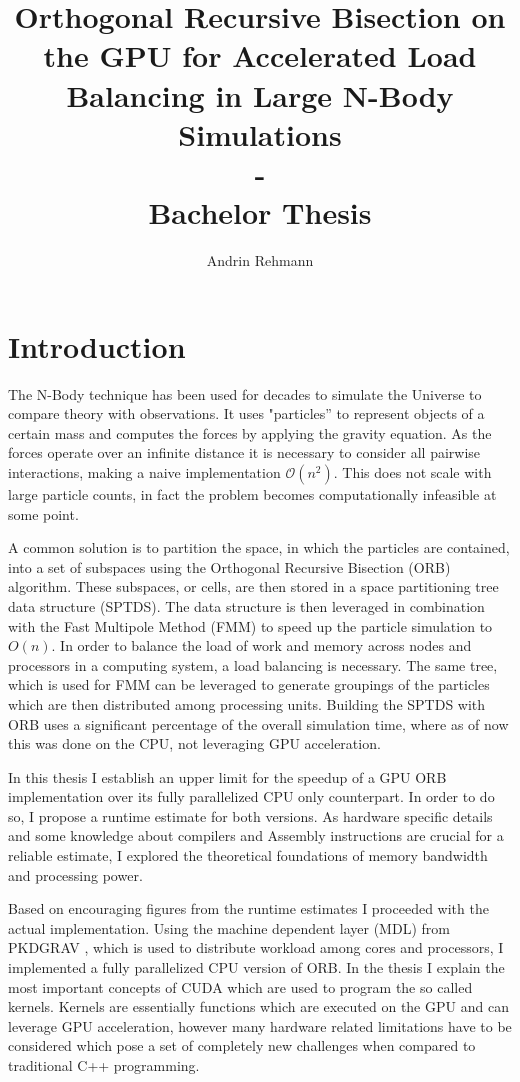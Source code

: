 \documentclass[]{article}
\title{Orthogonal Recursive Bisection on the GPU for Accelerated Load Balancing in Large N-Body Simulations \\ - \\ Bachelor Thesis}
\author{Andrin Rehmann}
\begin{document}
\maketitle

\newpage

\tableofcontents

\newpage
\section{Introduction}


The N-Body technique has been used for decades to simulate the Universe to compare theory with observations. It uses "particles'' to represent objects of a certain mass and computes the forces by applying the gravity equation. As the forces operate over an infinite distance it is necessary to consider all pairwise interactions, making a naive implementation $\mathcal{O}(n^2)$. This does not scale with large particle counts, in fact the problem becomes computationally infeasible at some point.

A common solution is to partition the space, in which the particles are contained, into a set of subspaces using the Orthogonal Recursive Bisection (ORB) algorithm. These subspaces, or cells, are then stored in a space partitioning tree data structure (SPTDS). The data structure is then leveraged in combination with the Fast Multipole Method (FMM) to speed up the particle simulation to $O(n)$. In order to balance the load of work and memory across nodes and processors in a computing system, a load balancing is necessary. The same tree, which is used for FMM can be leveraged to generate groupings of the particles which are then distributed among processing units. Building the SPTDS with ORB uses a significant percentage of the overall simulation time, \cite{Stadel2001} where as of now this was done on the CPU, not leveraging GPU acceleration.
 
In this thesis I establish an upper limit for the speedup of a GPU ORB implementation over its fully parallelized CPU only counterpart. In order to do so, I propose a runtime estimate for both versions. As hardware specific details and some knowledge about compilers and Assembly instructions are crucial for a reliable estimate, I explored the theoretical foundations of memory bandwidth and processing power. 

Based on encouraging figures from the runtime estimates I proceeded with the actual implementation. Using the machine dependent layer (MDL) from PKDGRAV \cite{Stadel2001}, which is used to distribute workload among cores and processors, I implemented a fully parallelized CPU version of ORB. In the thesis I explain the most important concepts of CUDA which are used to program the so called kernels. Kernels are essentially functions which are executed on the GPU and can leverage GPU acceleration, however many hardware related limitations have to be considered which pose a set of completely new challenges when compared to traditional C++ programming.
\end{document}
